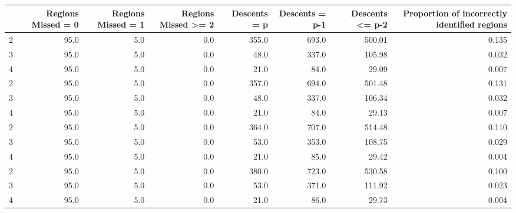 \begin{tabular}{lrrrrrrr}
\toprule
{} &  Regions Missed = 0 &  Regions Missed = 1 &  Regions Missed >= 2 &  Descents = p &  Descents = p-1 &  Descents <= p-2 &  Proportion of incorrectly identified regions \\
\midrule
2 &                95.0 &                 5.0 &                  0.0 &         355.0 &           693.0 &           500.01 &                                         0.135 \\
3 &                95.0 &                 5.0 &                  0.0 &          48.0 &           337.0 &           105.98 &                                         0.032 \\
4 &                95.0 &                 5.0 &                  0.0 &          21.0 &            84.0 &            29.09 &                                         0.007 \\
2 &                95.0 &                 5.0 &                  0.0 &         357.0 &           694.0 &           501.48 &                                         0.131 \\
3 &                95.0 &                 5.0 &                  0.0 &          48.0 &           337.0 &           106.34 &                                         0.032 \\
4 &                95.0 &                 5.0 &                  0.0 &          21.0 &            84.0 &            29.13 &                                         0.007 \\
2 &                95.0 &                 5.0 &                  0.0 &         364.0 &           707.0 &           514.48 &                                         0.110 \\
3 &                95.0 &                 5.0 &                  0.0 &          53.0 &           353.0 &           108.75 &                                         0.029 \\
4 &                95.0 &                 5.0 &                  0.0 &          21.0 &            85.0 &            29.42 &                                         0.004 \\
2 &                95.0 &                 5.0 &                  0.0 &         380.0 &           723.0 &           530.58 &                                         0.100 \\
3 &                95.0 &                 5.0 &                  0.0 &          53.0 &           371.0 &           111.92 &                                         0.023 \\
4 &                95.0 &                 5.0 &                  0.0 &          21.0 &            86.0 &            29.73 &                                         0.004 \\
\bottomrule
\end{tabular}
